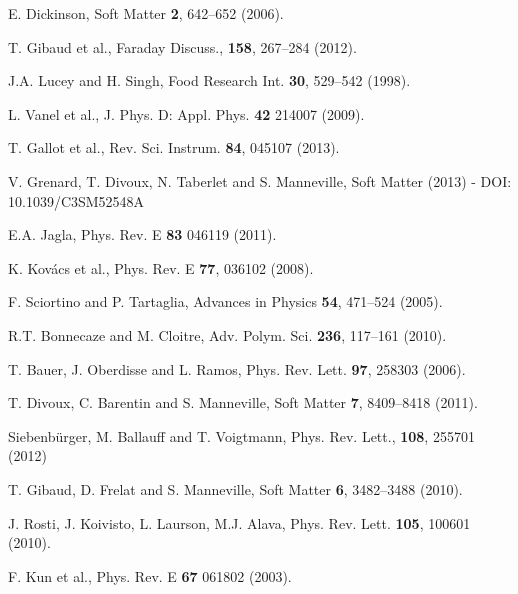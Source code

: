 \documentclass[twocolumn,superscriptaddress,showpacs,preprintnumbers,amsmath,amssymb,prl]{revtex4}
\begin{document}
\begin{thebibliography}{}
 E. Dickinson, Soft Matter {\bf 2}, 642--652 (2006).

 T. Gibaud et al., Faraday Discuss., {\bf 158}, 267--284 (2012).

 J.A. Lucey and H. Singh, Food Research Int. {\bf 30}, 529--542 (1998).



 L. Vanel et al., J. Phys. D: Appl. Phys. {\bf 42} 214007 (2009).

 T. Gallot et al., Rev. Sci. Instrum. {\bf 84}, 045107 (2013).

 V. Grenard, T. Divoux, N. Taberlet and S. Manneville, Soft Matter (2013) - DOI: 10.1039/C3SM52548A 

 E.A. Jagla, Phys. Rev. E {\bf 83} 046119 (2011).

 K. Kov\'acs et al., Phys. Rev. E \textbf{77}, 036102 (2008).

 F. Sciortino and P. Tartaglia, Advances in Physics {\bf 54}, 471--524 (2005).

 R.T. Bonnecaze and M. Cloitre, Adv. Polym. Sci. {\bf 236}, 117--161 (2010).

 T. Bauer, J. Oberdisse and L. Ramos, Phys. Rev. Lett. {\bf 97}, 258303 (2006).

 T. Divoux, C. Barentin and S. Manneville, Soft Matter {\bf 7}, 8409--8418 (2011).

 Siebenb\"urger, M. Ballauff and T. Voigtmann, Phys. Rev.
Lett., {\bf 108}, 255701 (2012)

 T. Gibaud, D. Frelat and S. Manneville, Soft Matter {\bf 6}, 3482--3488 (2010).

 J. Rosti, J. Koivisto, L. Laurson, M.J. Alava, Phys. Rev. Lett. {\bf 105}, 100601 (2010).


 F. Kun et al., Phys. Rev. E {\bf 67} 061802 (2003).



\end{thebibliography}
\end{document}
